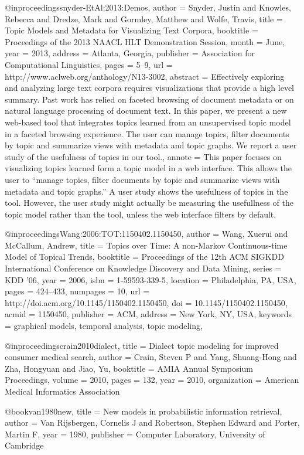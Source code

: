 @inproceedings{snyder-EtAl:2013:Demos,
	author = {Snyder, Justin and Knowles, Rebecca and Dredze, Mark and Gormley, Matthew	and	Wolfe, Travis},
	title = {Topic Models and Metadata for Visualizing Text Corpora},
	booktitle = {Proceedings of the 2013 NAACL HLT Demonstration Session},
	month = {June},
	year = {2013},
	address = {Atlanta, Georgia},
	publisher = {Association for Computational Linguistics},
	pages = {5--9},
	url = {http://www.aclweb.org/anthology/N13-3002},
	abstract = {Effectively exploring and analyzing large text corpora requires visualizations that provide a high level summary. Past work has relied on faceted browsing of document metadata or on natural language processing of document text. In this paper, we present a new web-based tool that integrates topics learned from an unsupervised topic model in a faceted browsing experience. The user can manage topics, filter documents by topic and summarize views with metadata and topic graphs. We report a user study of the usefulness of topics in our tool.},
	annote = {This paper focuses on visualizing topics learned form a topic model in a web interface. This allows the user to ``manage topics, filter documents by topic and summarize views with metadata and topic graphs.'' A user study shows the usefulness of topics in the tool. However, the user study might actually be measuring the usefullness of the topic model rather than the tool, unless the web interface filters by default.}
}

@inproceedings{Wang:2006:TOT:1150402.1150450,
	author = {Wang, Xuerui and McCallum, Andrew},
	title = {Topics over Time: A non-Markov Continuous-time Model of Topical Trends},
	booktitle = {Proceedings of the 12th ACM SIGKDD International Conference on Knowledge Discovery and Data Mining},
	series = {KDD '06},
	year = {2006},
	isbn = {1-59593-339-5},
	location = {Philadelphia, PA, USA},
	pages = {424--433},
	numpages = {10},
	url = {http://doi.acm.org/10.1145/1150402.1150450},
	doi = {10.1145/1150402.1150450},
	acmid = {1150450},
	publisher = {ACM},
	address = {New York, NY, USA},
	keywords = {graphical models, temporal analysis, topic modeling},
}

@inproceedings{crain2010dialect,
	title = {Dialect topic modeling for improved consumer medical search},
	author = {Crain, Steven P and Yang, Shuang-Hong and Zha, Hongyuan and Jiao, Yu},
	booktitle = {AMIA Annual Symposium Proceedings},
	volume = {2010},
	pages = {132},
	year = {2010},
	organization = {American Medical Informatics Association}
}

@book{van1980new,
	title = {New models in probabilistic information retrieval},
	author = {Van Rijsbergen, Cornelis J and Robertson, Stephen Edward and Porter, Martin F},
	year = {1980},
	publisher = {Computer Laboratory, University of Cambridge}
}

